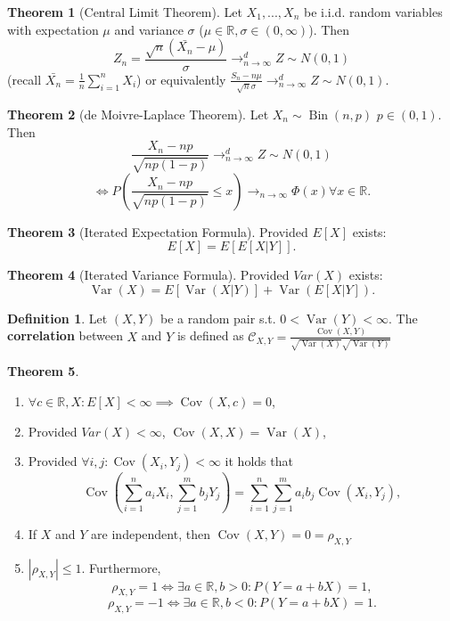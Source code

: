 \documentclass[11pt]{article}
\theoremstyle{definition}
\DeclareMathOperator{\Bin}{Bin}
\DeclareMathOperator{\var}{Var}
\DeclareMathOperator{\cov}{Cov}
\newtheorem{thm}{Theorem}
\newtheorem{defn}{Definition}
\begin{document}
\begin{thm}[Central Limit Theorem] Let $X_1,...,X_n$ be i.i.d. random variables with expectation $\mu$ and variance $\sigma$ ($\mu\in\mathbb{R},\sigma\in(0,\infty)$). Then \[Z_n=\frac{\sqrt{n}(\bar{X_n}-\mu)}{\sigma}\rightarrow^d_{n\rightarrow\infty}Z\sim N(0,1)\]
(recall $\bar{X_n}=\frac{1}{n}\sum^n_{i=1}X_i$) or equivalently $\frac{S_n-n\mu}{\sqrt{n}\sigma}\rightarrow^d_{n\rightarrow\infty}Z\sim N(0,1)$.
\end{thm}

\begin{thm}[de Moivre-Laplace Theorem] Let $X_n\sim\Bin(n,p)$ $p\in(0,1)$. Then 
\[\frac{X_n-np}{\sqrt{np(1-p)}}\rightarrow^d_{n\rightarrow\infty}Z\sim N(0,1)\]
\[\iff P(\frac{X_n-np}{\sqrt{np(1-p)}}\leq x)\rightarrow_{n\rightarrow\infty}\Phi(x) \forall x\in \mathbb{R}.\]
\end{thm}

\begin{thm}[Iterated Expectation Formula] Provided $E[X]$ exists:
\[ E[X]=E[E[X|Y]].\]
\end{thm}

\begin{thm}[Iterated Variance Formula] Provided $Var(X)$ exists:
\[ \var(X)=E[\var(X|Y)]+ \var(E[X|Y]).\]
\end{thm}

\begin{defn}
Let $(X,Y)$ be a random pair s.t. $0<\var(Y)<\infty$. The \textbf{correlation} between $X$ and $Y$ is defined as $\mathcal{C}_{X,Y}=\frac{\cov(X,Y)}{\sqrt{\var(X)}\sqrt{\var(Y)}}$
\end{defn}

\begin{thm}
\begin{enumerate}
\item $\forall c \in \mathbb{R},X:E[X]<\infty \implies \cov(X,c)=0$,
\item Provided $Var(X)<\infty$, $\cov(X,X)=\var(X)$,
\item Provided $\forall i,j:\cov(X_i,Y_j)<\infty$ it holds that \[\cov(\sum^n_{i=1}a_i X_i,\sum^m_{j=1}b_j Y_j)=\sum^n_{i=1}\sum^m_{j=1} a_i b_j \cov(X_i,Y_j),\]
\item If $X$ and $Y$ are independent, then $\cov(X,Y)=0=\rho_{X,Y}$
\item $|\rho_{X,Y}|\leq 1.$ Furthermore, 
\[\rho_{X,Y}=1\iff \exists a\in\mathbb{R},b>0:P(Y=a+bX)=1,\]
\[\rho_{X,Y}=-1\iff \exists a\in\mathbb{R},b<0:P(Y=a+bX)=1.\]
\end{enumerate}
\end{thm}
\end{document}
